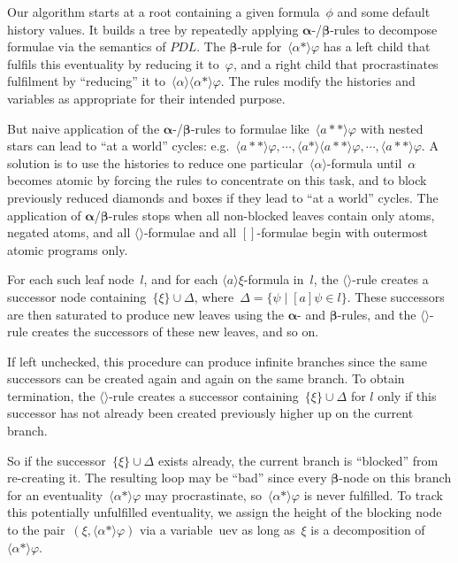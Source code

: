 \documentclass{entcs}
\newcommand{\pea}[2]{\langle#1\rangle #2}
\newcommand{\paa}[2]{[#1] #2}
\newcommand{\prp}[1]{#1*}
\newcommand{\pdl}{$PDL$}
\newcommand{\fea}{$\pea{}{}$}
\newcommand{\tuev}{\mathrm{uev}}
\newcommand{\talpha}{\boldsymbol{\alpha}}
\newcommand{\tbeta}{\boldsymbol{\beta}}
\newcommand{\trea}{$\langle\rangle$}
\begin{document}
Our algorithm starts at a root
containing a given formula~$\phi$
and some default history values.
It builds a tree by repeatedly applying $\talpha$-/$\tbeta$-rules
to decompose formulae via the semantics of \pdl{}.
The $\tbeta$-rule for~$\pea{\prp{\alpha}}{\varphi}$ has a left child
that fulfils this eventuality by reducing it to~$\varphi$,
and a right child
that procrastinates fulfilment by ``reducing'' it to~$\pea{\alpha}{\pea{\prp{\alpha}}{\varphi}}$.
The rules modify the histories and variables as appropriate
for their intended purpose.

But naive application of the $\talpha$-/$\tbeta$-rules to
formulae like~$\pea{\prp{\prp{a}}}{\varphi}$
with nested stars can lead to ``at a world'' cycles: e.g.\
$
  \pea{\prp{\prp{a}}}{\varphi},
  \cdots ,
  \pea{\prp{a}}{\pea{\prp{\prp{a}}}{\varphi}},
  \cdots ,
  \pea{\prp{\prp{a}}}{\varphi}
$.
A solution is to use the histories to reduce one particular~$\pea{\alpha}{}$-formula
until~$\alpha$ becomes atomic by forcing the rules to concentrate on
this task, and 
to block previously reduced diamonds and boxes
if they lead to ``at a world'' cycles.
The application of $\talpha$/$\tbeta$-rules stops
when all non-blocked leaves contain only atoms, negated atoms,
and all \fea{}-formulae and all $\paa{}{}$-formulae
begin with outermost atomic programs only.

For each such leaf node~$l$, and for each $\pea{a}{\xi}$-formula in~$l$,
the \trea{}-rule creates a successor node containing~$\{ \xi \} \cup \Delta$,
where~$\Delta = \{\psi \mid \paa{a}{\psi} \in l\}$.
These successors are then saturated to produce new leaves
using the $\talpha$- and $\tbeta$-rules,
and the \trea{}-rule creates the successors of these new leaves, and so on.

If left unchecked, this procedure can produce infinite branches
since the same successors can be created again and again on the same branch.
To obtain termination,
the \trea{}-rule creates a successor containing~$\{ \xi \} \cup \Delta$ for $l$
only if 
this successor has not already been created previously higher up on the current branch.

So if the successor~$\{ \xi \} \cup \Delta$ exists already,
the current branch is ``blocked'' from re-creating it.
The resulting loop may be ``bad'' since every $\tbeta$-node
on this branch for an eventuality~$\pea{\prp{\alpha}}{\varphi}$ may procrastinate,
so~$\pea{\prp{\alpha}}{\varphi}$ is never fulfilled.
To track this potentially unfulfilled eventuality,
we assign the height of the blocking node to the pair~$(\xi, \pea{\prp{\alpha}}{\varphi})$ 
via a variable~$\tuev$ as long as~$\xi$ is a decomposition of~$\pea{\prp{\alpha}}{\varphi}$.
\end{document}
